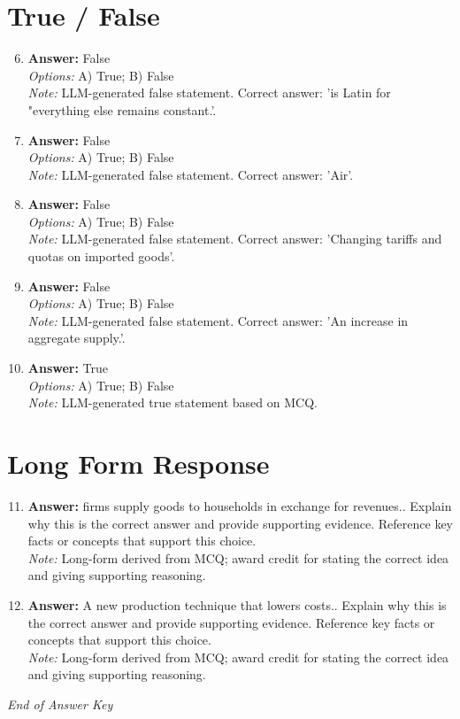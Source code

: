 \documentclass[12pt]{article}
\begin{document}
\section*{True / False}
\begin{enumerate}[label=\arabic*.]
\setcounter{enumi}{5}
\item \textbf{Answer:} False
\\ \textit{Options:} A) True; B) False
\\ \textit{Note:} LLM-generated false statement. Correct answer: 'is Latin for "everything else remains constant.'.
\item \textbf{Answer:} False
\\ \textit{Options:} A) True; B) False
\\ \textit{Note:} LLM-generated false statement. Correct answer: 'Air'.
\item \textbf{Answer:} False
\\ \textit{Options:} A) True; B) False
\\ \textit{Note:} LLM-generated false statement. Correct answer: 'Changing tariffs and quotas on imported goods'.
\item \textbf{Answer:} False
\\ \textit{Options:} A) True; B) False
\\ \textit{Note:} LLM-generated false statement. Correct answer: 'An increase in aggregate supply.'.
\item \textbf{Answer:} True
\\ \textit{Options:} A) True; B) False
\\ \textit{Note:} LLM-generated true statement based on MCQ.
\end{enumerate}

\section*{Long Form Response}
\begin{enumerate}[label=\arabic*.]
\setcounter{enumi}{10}
\item \textbf{Answer:} firms supply goods to households in exchange for revenues.. Explain why this is the correct answer and provide supporting evidence. Reference key facts or concepts that support this choice.
\\ \textit{Note:} Long-form derived from MCQ; award credit for stating the correct idea and giving supporting reasoning.
\item \textbf{Answer:} A new production technique that lowers costs.. Explain why this is the correct answer and provide supporting evidence. Reference key facts or concepts that support this choice.
\\ \textit{Note:} Long-form derived from MCQ; award credit for stating the correct idea and giving supporting reasoning.
\end{enumerate}

\vfill
\noindent\textit{End of Answer Key}
\end{document}
